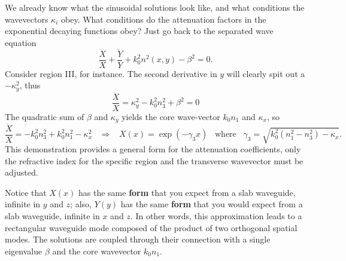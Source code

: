 We already know what the sinusoidal solutions look like, and what conditions the wavevectors $\kappa_i$ obey. What conditions do the attenuation factors in the exponential decaying functions obey? Just go back to the separated wave equation
\begin{equation}
    \frac{\ddot{X}}{X}+\frac{\ddot{Y}}{Y}+k_0^2n^2(x,y)-\beta^2=0.
\end{equation}
Consider region III, for instance. The second derivative in $y$ will clearly spit out a $-\kappa^2_y$, thus
\begin{equation}
    \frac{\ddot{X}}{X}=\kappa^2_y-k_0^2n^2_3+\beta^2=0
\end{equation}
The quadratic sum of $\beta$ and $\kappa_y$ yields the core wave-vector $k_0n_1$ and $\kappa_x$, so
\begin{equation}
    \frac{\ddot{X}}{X}=-k_0^2n^2_3+k_0^2n^2_1-\kappa_x^2\;\;\;\Rightarrow\;\;\; X(x)=\exp(-\gamma_3x)\;\;\;\text{where}\;\;\;\gamma_3=\sqrt{k_0^2(n_1^2-n_3^2)-\kappa_x}.
\end{equation}
This demonstration provides a general form for the attenuation coefficients, only the refractive index for the specific region and the transverse wavevector must be adjusted.

Notice that $X(x)$ has the same \textbf{form} that you expect from a slab waveguide, infinite in $y$ and $z$; also, $Y(y)$ has the same \textbf{form} that you would expect from a slab waveguide, infinite in $x$ and $z$. In other words, this approximation leads to a rectangular waveguide mode composed of the product of two orthogonal spatial modes. The solutions are coupled through their connection with a single eigenvalue $\beta$ and the core wavevector $k_0n_1$.

